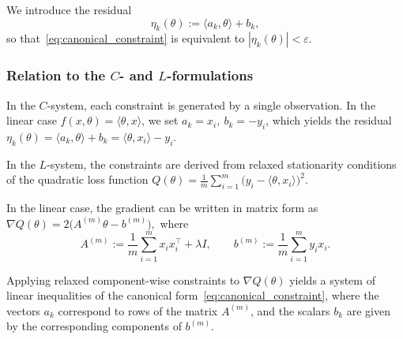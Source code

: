 \documentclass[a4paper,fleqn]{cas-sc}
\begin{document}


We introduce the residual
\begin{equation}
\label{eq:eta}
\eta_k(\theta) := \langle a_k, \theta \rangle + b_k,
\end{equation}
so that~\eqref{eq:canonical_constraint} is equivalent to
$|\eta_k(\theta)| < \varepsilon$.

\subsubsection{Relation to the $C$- and $L$-formulations}

In the $C$-system, each constraint is generated by a single observation.
In the linear case $f(x,\theta) = \langle \theta, x \rangle$, we set
$a_k = x_i,~b_k = -y_i$, which yields the residual
$
\eta_k(\theta)
=
\langle a_k, \theta \rangle + b_k
=
\langle \theta, x_i \rangle - y_i .
$


In the $L$-system, the constraints are derived from relaxed stationarity conditions of the quadratic loss function
$
Q(\theta)
=
\frac{1}{m}\sum_{i=1}^{m}\bigl(y_i-\langle\theta,x_i\rangle\bigr)^2 .
$

In the linear case, the gradient can be written in matrix form as
$
\nabla Q(\theta)
=
2\bigl(A^{(m)}\theta - b^{(m)}\bigr),
$
where
$$
A^{(m)} := \frac{1}{m}\sum_{i=1}^{m} x_i x_i^\top + \lambda I,
\qquad
b^{(m)} := \frac{1}{m}\sum_{i=1}^{m} y_i x_i.
$$

Applying relaxed component-wise constraints to $\nabla Q(\theta)$
yields a system of linear inequalities of the canonical form~\eqref{eq:canonical_constraint},
where the vectors $a_k$ correspond to rows of the matrix $A^{(m)}$,
and the scalars $b_k$ are given by the corresponding components of $b^{(m)}$.



\end{document}
